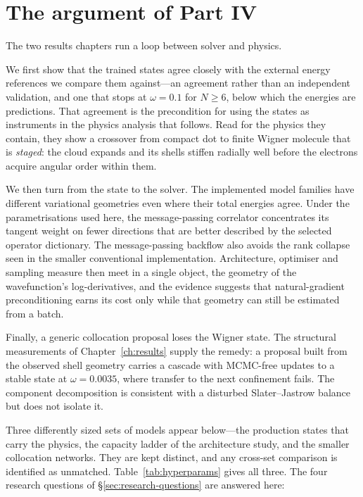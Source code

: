 \begingroup
\let\clearpage\relax
\let\cleardoublepage\relax
\chapter*{The argument of Part IV}
\endgroup
{}
\label{ch:results-map}

The two results chapters run a loop between solver and physics.

We first show that the trained states agree closely with the external energy references we
compare them against---an agreement rather than an independent validation, and one that stops
at $\omega=0.1$ for $N\ge6$, below which the energies are predictions. That
agreement is the precondition for using the states as instruments in the physics analysis
that follows. Read for the physics they contain, they show a crossover from compact dot to
finite Wigner molecule that is \emph{staged}: the cloud expands and its shells stiffen
radially well before the electrons acquire angular order within them.

We then turn from the state to the solver. The implemented model families have different
variational geometries even where their total energies agree. Under the parametrisations
used here, the message-passing correlator concentrates its tangent weight on fewer directions
that are better described by the selected operator dictionary. The message-passing backflow
also avoids the rank collapse seen in the smaller conventional implementation. Architecture,
optimiser and sampling measure then meet
in a single object, the geometry of the wavefunction's log-derivatives, and the evidence
suggests that natural-gradient preconditioning earns its cost only while that geometry can
still be estimated from a batch.

Finally, a generic collocation proposal loses the Wigner state. The structural
measurements of Chapter~\ref{ch:results} supply the remedy: a proposal built from the
observed shell geometry carries a cascade with MCMC-free updates to a stable state at
$\omega=0.0035$, where transfer to the next confinement fails. The component decomposition
is consistent with a disturbed Slater--Jastrow balance but does not isolate it.

\medskip
\noindent Three differently sized sets of models appear below---the production states that
carry the physics, the capacity ladder of the architecture study, and the smaller collocation
networks. They are kept distinct, and any cross-set comparison is identified as unmatched.
Table~\ref{tab:hyperparams} gives all three. The four research questions of
\S\ref{sec:research-questions} are answered here:


